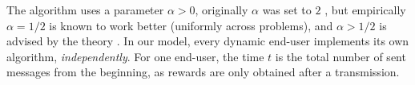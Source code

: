 
The \UCB{} algorithm uses a parameter $\alpha > 0$, originally $\alpha$ was set to $2$ \cite{Auer02}, but empirically $\alpha = 1/2$ is known to work better (uniformly across problems), and $\alpha > 1/2$ is advised by the theory \cite{Bubeck12}.
%
In our model, every dynamic end-user implements its own \UCB{} algorithm, \emph{independently}.
For one end-user, the time $t$ is the total number of sent messages from the beginning, as rewards are only obtained after a transmission.





